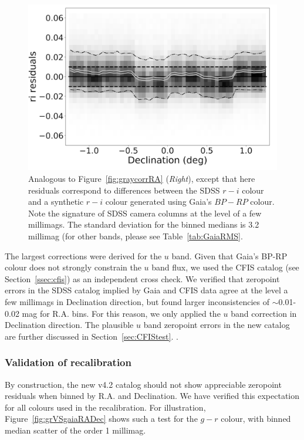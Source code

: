 \documentclass[fleqn,usenatbib]{mnras}
\begin{document}
 

\begin{figure}
    \centering\includegraphics[width=0.9\columnwidth]{figures/colorResidGaiaColorsB_ri_Dec_Hess_lr.png} 
\caption{Analogous to Figure~\ref{fig:graycorrRA} ({\it Right}), except that here residuals 
correspond to differences between the SDSS $r-i$ colour and a synthetic $r-i$ colour
generated using Gaia's $BP-RP$ colour. Note the signature of SDSS camera columns
at the level of a few millimags. The standard deviation for the binned medians is 
3.2 millimag (for other bands, please see Table~\ref{tab:GaiaRMS}.}
\label{fig:riresid}
\end{figure}


The largest corrections were derived for the $u$ band. Given that Gaia's BP-RP
colour does not strongly constrain the $u$ band flux, we used the CFIS catalog 
(see Section~\ref{ssec:cfis}) as an independent cross check. We verified that
zeropoint errors in the SDSS catalog implied by Gaia and CFIS data agree at the
level a few millimags in Declination direction, but found larger inconsistencies of $\sim$0.01-0.02 mag
 for R.A. bins. For this reason, we only applied the $u$ band 
correction in Declination direction. The plausible $u$ band zeropoint errors in 
the new catalog are further discussed in Section~\ref{sec:CFIStest}. . 



\subsubsection{Validation of recalibration  \label{sec:SSCvsGaia}} 
  
By construction, the new v4.2 catalog should not show appreciable zeropoint residuals when 
binned by R.A. and Declination. We have verified this expectation for all colours used in 
the recalibration. For illustration, Figure~\ref{fig:grVSgaiaRADec} shows such a test for the $g-r$ 
colour, with binned median scatter of the order 1 millimag. 
\end{document}
